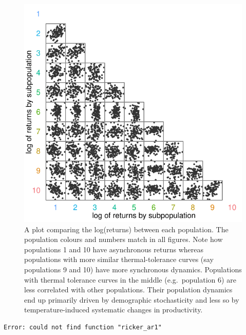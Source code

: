 \documentclass[12pt]{article}
\begin{document}
\begin{figure}[htbp]
\centering
\includegraphics{figure/plot-base-corrs.pdf}
\caption{A plot comparing the log(returns) between each population. The
population colours and numbers match in all figures. Note how
populations 1 and 10 have asynchronous returns whereas populations with
more similar thermal-tolerance curves (say populations 9 and 10) have
more synchronous dynamics. Populations with thermal tolerance curves in
the middle (e.g.~population 6) are less correlated with other
populations. Their population dynamics end up primarily driven by
demographic stochasticity and less so by temperature-induced systematic
changes in productivity.}
\end{figure}

\begin{verbatim}
Error: could not find function "ricker_ar1"
\end{verbatim}
\end{document}

